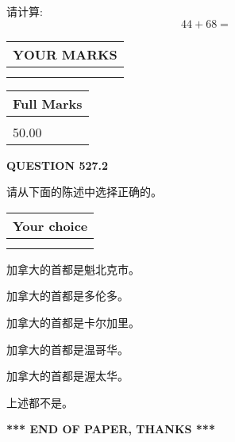 \documentclass{ctexart}
\begin{document}
  
 
请计算:
\begin{equation}
44 +  %
68 = \nonumber
\end{equation}
 

 

 
  
\vspace{0.2in}
  
\noindent\begin{tabular}{|l|}
\hline
 YOUR MARKS  \\
\hline
 \\ 
 \\ 
\hline
\end{tabular}
\hspace{0.05in} \begin{tabular}{|l|}
\hline
 Full Marks  \\
\hline
 \\ 
50.00 \\
\hline
\end{tabular}
{\textbf{\Large{QUESTION
527.2 
}}}
  
  
请从下面的陈述中选择正确的。
  
  
\noindent\hspace{3.0in} \begin{tabular}{|l|}
\hline
Your choice \\
\hline
 \\ 
 \\ 
\hline
\end{tabular}
  
  
 
 
加拿大的首都是魁北克市。
 
 
加拿大的首都是多伦多。
 
 
加拿大的首都是卡尔加里。
 
 
加拿大的首都是温哥华。
 
 
加拿大的首都是渥太华。
 
 
 上述都不是。
 
 
   
   
 \vspace{0.2in}
 
   
   
   
   
\vspace{1.0in} 
{\textbf{\large{ *** END OF PAPER, THANKS *** }}} 
   
\end{document}
